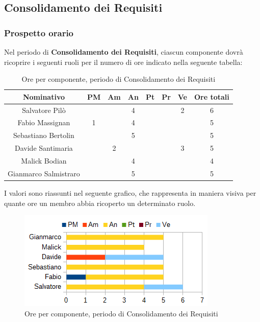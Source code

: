 	\subsection{Consolidamento dei Requisiti}
		\subsubsection{Prospetto orario}
		Nel periodo di \textbf{Consolidamento dei Requisiti}, ciascun componente dovrà ricoprire i seguenti ruoli per il numero di ore indicato nella seguente tabella: \\
		\begin{table}[H]
		\centering
		\begin{tabular}{|c|c|c|c|c|c|c|c|}
			\hline
			\textbf{Nominativo}		& \textbf{PM}	& \textbf{Am}	& \textbf{An}	& \textbf{Pt}	& \textbf{Pr}	& \textbf{Ve}	& \textbf{Ore totali}     \\
			\hline
			Salvatore Pilò			&		& 		& 4		&		&		& 2		& 6 \\
			Fabio Massignan			& 1		& 		& 4		&		&		& 		& 5 \\
			Sebastiano Bertolin		&		& 		& 5		&		&		&		& 5 \\
			Davide Santimaria		&		& 2		&		&		&		& 3		& 5 \\
			Malick Bodian			& 		& 		& 4		&		&		& 		& 4 \\
			Gianmarco Salmistraro	&		& 		& 5		&		&		& 		& 5 \\
			\hline
		\end{tabular}
		\caption{Ore per componente, periodo di Consolidamento dei Requisiti}
		\end{table}
		I valori sono riassunti nel seguente grafico, che rappresenta in maniera visiva per quante ore un membro abbia ricoperto un determinato ruolo. \\
		\begin{figure}[H]
			\centering
			\includegraphics[scale=1]{immagini/grafici/analisi_dettaglio-barra.png}
			\caption{Ore per componente, periodo di Consolidamento dei Requisiti}
		\end{figure}

